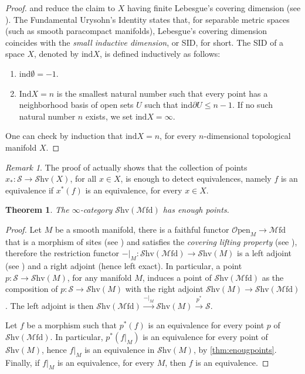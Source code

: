 \documentclass[10pt]{amsart}
\newcommand{\s}{\mathscr{S}}
\newcommand{\Mfd}{\mathscr{M}\mathrm{fd}}
\newcommand{\Shv}{\mathscr{S}\mathrm{hv}}
\newcommand{\Open}{\mathscr{O}\mathrm{pen}}
\newtheorem{theorem}[equation]{Theorem}
\theoremstyle{definition}
\theoremstyle{remark}
\newtheorem{remark}[equation]{Remark}
\numberwithin{equation}{section}
\begin{document}
\begin{proof}
	\cite[Corollary 7.2.1.17]{lurie2009htt} and \cite[Theorem 7.2.3.6]{lurie2009htt} reduce the claim to $X$ having finite Lebesgue's covering dimension (see \cite[Definition 7.2.3.1]{lurie2009htt}). The Fundamental Urysohn's Identity states that, for separable metric spaces (such as smooth paracompact manifolds), Lebesgue's covering dimension coincides with the \emph{small inductive dimension}, or SID, for short. The SID of a space $X$, denoted by $\mathrm{ind}X$, is defined inductively as follows: 
	\begin{enumerate}
		\item $\mathrm{ind}\emptyset=-1$.
		\item $\mathrm{Ind}X=n$ is the smallest natural number such that every point has a neighborhood basis of open sets $U$ such that $\mathrm{ind}\partial U\leq n-1$. If no such natural number $n$ exists, we set $\mathrm{ind}X=\infty$.
	\end{enumerate}One can check by induction that $\mathrm{ind} X=n$, for every $n$-dimensional topological manifold $X$.
\end{proof}
\begin{remark}\label{rmk:geopoints}
	The proof of \cite[Corollary 7.2.1.17]{lurie2009htt} actually shows that the collection of points $x_*:\s\to\Shv(X)$, for all $x\in X$, is enough to detect equivalences, namely $f$ is an equivalence if $x^*(f)$ is an equivalence, for every $x\in X$. 
\end{remark}
\begin{theorem}\label{thm:mfdenoughpoints}
	The $\infty$-category $\Shv(\Mfd)$ has enough points. 
\end{theorem}
\begin{proof}
	Let $M$ be a smooth manifold, there is a faithful functor $\Open_M\to\Mfd$ that is a morphism of sites (see \cite[Definition A.10]{pstragowski2022syntheticspectracellularmotivic}) and satisfies the \emph{covering lifting property} (see \cite[Definition A.12]{pstragowski2022syntheticspectracellularmotivic}), therefore the restriction functor $-|_{M}:\Shv(\Mfd)\to\Shv(M)$ is a left adjoint (see \cite[Proposition A.13]{pstragowski2022syntheticspectracellularmotivic}) and a right adjoint (hence left exact). In particular, a point $p:\s\to\Shv(M)$, for any manifold $M$, induces a point of $\Shv(\Mfd)$ as the composition of $p:\s\to\Shv(M)$ with the right adjoint $\Shv(M)\to\Shv(\Mfd)$. The left adjoint is then $\Shv(\Mfd)\xrightarrow{-|_M}\Shv(M)\xrightarrow{p^*}\s$. 
	
	Let $f$ be a morphism such that $p^*(f)$ is an equivalence for every point $p$ of $\Shv(\Mfd)$. In particular, $p^*(f|_M)$ is an equivalence for every point of $\Shv(M)$, hence $f|_M$ is an equivalence in $\Shv(M)$, by \cref{thm:enougpoints}. Finally, if $f|_M$ is an equivalence, for every $M$, then $f$ is an equivalence. 
\end{proof}
\end{document}
